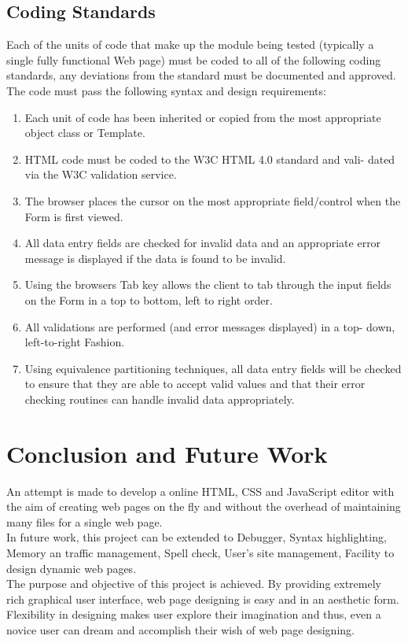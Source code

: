 \documentclass[12pt,a4paper]{article}
\begin{document}
\subsection{Coding Standards}
Each of the units of code that make up the module being tested (typically a single fully functional Web page) must be coded to all of the following coding standards, any deviations from the standard must be documented and approved.\\
The code must pass the following syntax and design requirements:
\begin{enumerate}
\item Each unit of code has been inherited or copied from the most appropriate object class or Template.
\item  HTML code must be coded to the W3C HTML 4.0 standard and vali- dated via the W3C validation service.
\item The browser places the cursor on the most appropriate field/control
when the Form is first viewed.
\item All data entry fields are checked for invalid data and an appropriate error message is displayed if the data is found to be invalid.
\item Using the browsers Tab key allows the client to tab through the input fields on the Form in a top to bottom, left to right order.
\item All validations are performed (and error messages displayed) in a top- down, left-to-right Fashion.
\item Using equivalence partitioning techniques, all data entry fields will be checked to ensure that they are able to accept valid values and that their error checking routines can handle invalid data appropriately.
\end{enumerate}
\newpage
\section{Conclusion and Future Work}
An attempt is made to develop a online HTML, CSS and JavaScript editor with the aim of creating web pages on the fly and without the overhead of maintaining many files for a single web page.\\

In future work, this project can be extended to Debugger, Syntax highlighting, Memory an traffic management, Spell check, User's site management, Facility to design dynamic web pages.\\

The purpose and objective of this project is achieved. By providing extremely rich graphical user interface, web page designing is easy and in an aesthetic form. Flexibility in designing makes user explore their imagination and thus, even a novice user can dream and accomplish their wish of web page designing.\\
\end{document}
